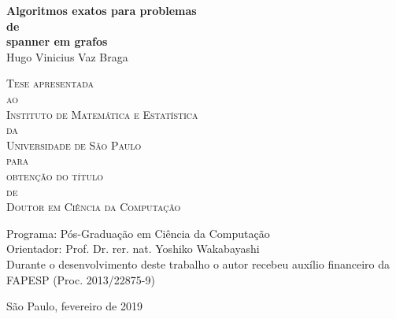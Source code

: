 \documentclass[12pt,twoside,a4paper]{book}
\newcommand{\autor}{Hugo Vinicius Vaz Braga}
\begin{document}
\frontmatter 
\fancyhead[RO]{{\footnotesize\rightmark}\hspace{2em}\thepage}
\setcounter{tocdepth}{2}
\fancyhead[LE]{\thepage\hspace{2em}\footnotesize{\leftmark}}
\fancyhead[RE,LO]{}
\fancyhead[RO]{{\footnotesize\rightmark}\hspace{2em}\thepage}

\onehalfspacing  %

\thispagestyle{empty}
\begin{center}
    \vspace*{2.3cm}
    \textbf{\Large{Algoritmos exatos para problemas \\ \vspace{-0.3cm} de \\ spanner em grafos}}\\
    
    \vspace*{1.2cm}
    \Large{\autor}
    
    \vskip 2cm
    \textsc{
    Tese apresentada\\[-0.25cm] 
    ao\\[-0.25cm]
    Instituto de Matemática e Estatística\\[-0.25cm]
    da\\[-0.25cm]
    Universidade de São Paulo\\[-0.25cm]
    para\\[-0.25cm]
    obtenção do título\\[-0.25cm]
    de\\[-0.25cm]
    Doutor em Ciência da Computação}
    
    \vskip 1.5cm
    Programa: Pós-Graduação em Ciência da Computação\\
    Orientador: Prof. Dr. rer. nat. Yoshiko Wakabayashi\\

   	\vskip 1cm
    \normalsize{Durante o desenvolvimento deste trabalho o autor recebeu auxílio
    financeiro da FAPESP (Proc. 2013/22875-9)}
    
    \vskip 0.5cm
    \normalsize{São Paulo, fevereiro de 2019}
\end{center}
\end{document}
